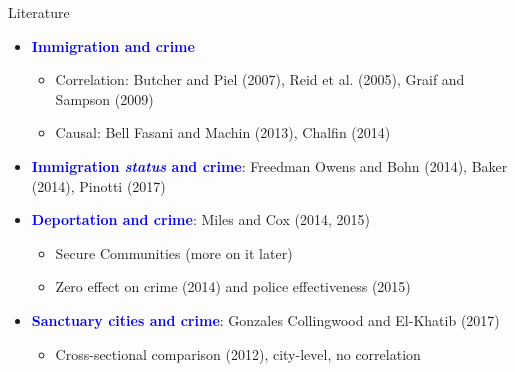 \documentclass[xcolor=pdftex,dvipsnames,table,handout]{beamer}
\begin{document}
\begin{frame}{Literature}
\pause
\begin{itemize}
\item \textbf{\textcolor{Blue}{Immigration and crime}}\vspace{0.10cm}
\begin{itemize}
\item Correlation: Butcher and Piel (2007), Reid et al. (2005), Graif and Sampson (2009)\vspace{0.10cm}
\item Causal: Bell Fasani and Machin (2013), Chalfin (2014)
\end{itemize}\vspace{0.20cm}\pause
\item \textbf{\textcolor{Blue}{Immigration \textit{status} and crime}}: Freedman Owens and Bohn (2014), Baker (2014), Pinotti (2017)\vspace{0.20cm}\pause
\item \textbf{\textcolor{Blue}{Deportation and crime}}: Miles and Cox (2014, 2015) \vspace{0.10cm}
\begin{itemize}
\item Secure Communities (more on it later) \vspace{0.10cm}
\item Zero effect on crime (2014) and police effectiveness (2015)
\end{itemize}\vspace{0.20cm}\pause
\item \textbf{\textcolor{Blue}{Sanctuary cities and crime}}: Gonzales Collingwood and El-Khatib (2017) \vspace{0.10cm}
\begin{itemize}
\item Cross-sectional comparison (2012), city-level, no correlation
\end{itemize}
\end{itemize}
\end{frame}
\end{document}

